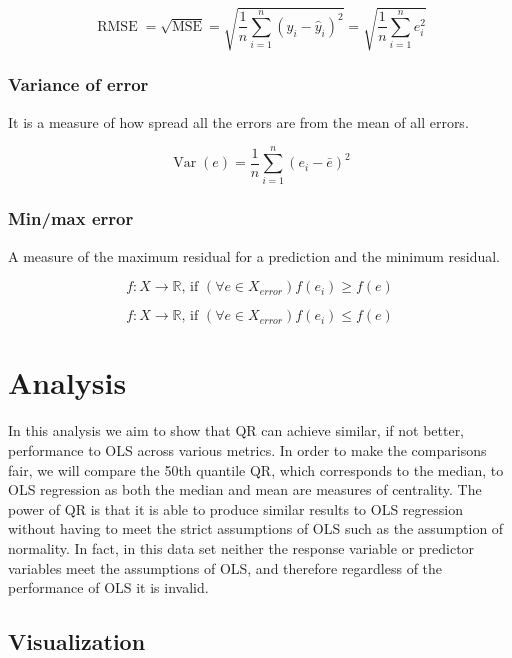 \documentclass[
  letterpaper,
  DIV=11,
  numbers=noendperiod]{scrreprt}
\begin{document}
\[
\operatorname{RMSE}=\sqrt{\operatorname{MSE}}=\sqrt{\frac{1}{n}\sum_{i=1}^n (y_i-\hat{y}_i)^2}=\sqrt{\frac{1}{n}\sum_{i=1}^n e_i^2}
\]

\hypertarget{variance-of-error}{%
\subsection{Variance of error}\label{variance-of-error}}

It is a measure of how spread all the errors are from the mean of all
errors.

\[
\operatorname{Var}(e)=\frac{1}{n}\sum_{i=1}^n(e_i-\bar{e})^2
\]

\hypertarget{minmax-error}{%
\subsection{Min/max error}\label{minmax-error}}

A measure of the maximum residual for a prediction and the minimum
residual.

\[
f: X \rightarrow \mathbb{R} \text {, if }(\forall e \in X_{error}) f\left(e_i\right) \geq f(e)
\]

\[
f: X \rightarrow \mathbb{R} \text {, if }(\forall e \in X_{error}) f\left(e_i\right) \leq f(e)
\]


\hypertarget{analysis}{%
\chapter{Analysis}\label{analysis}}

In this analysis we aim to show that QR can achieve similar, if not
better, performance to OLS across various metrics. In order to make the
comparisons fair, we will compare the 50th quantile QR, which
corresponds to the median, to OLS regression as both the median and mean
are measures of centrality. The power of QR is that it is able to
produce similar results to OLS regression without having to meet the
strict assumptions of OLS such as the assumption of normality. In fact,
in this data set neither the response variable or predictor variables
meet the assumptions of OLS, and therefore regardless of the performance
of OLS it is invalid.

\hypertarget{visualization}{%
\section{Visualization}\label{visualization}}
\end{document}
